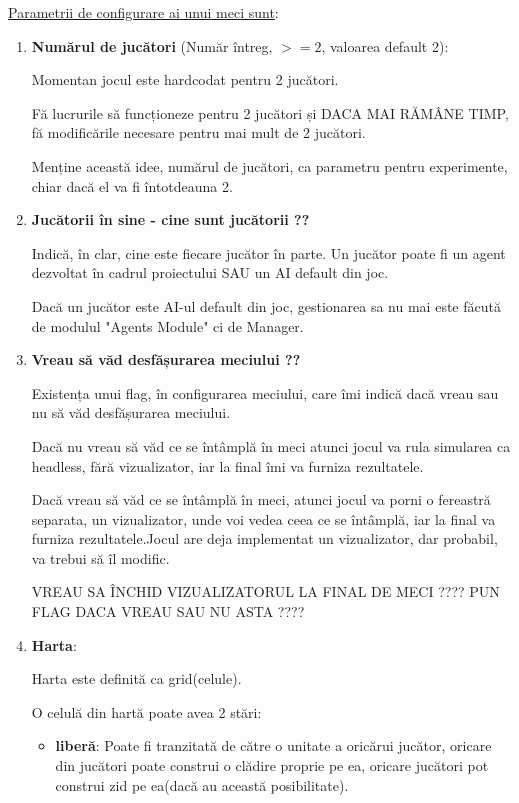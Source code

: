 \documentclass{article}
\begin{document}
\underline{Parametrii de configurare ai unui meci sunt}:
\begin{enumerate}
    \item \textbf{ Numărul de jucători }(Număr întreg, $>=2$, valoarea default 2):

    Momentan jocul este hardcodat pentru 2 jucători.

    Fă lucrurile să funcționeze pentru 2 jucători și DACA MAI RĂMÂNE TIMP, fă modificările necesare pentru mai mult de 2 jucători.

    Menține această idee, numărul de jucători, ca parametru pentru experimente, chiar dacă el va fi întotdeauna 2.

    \item \textbf{Jucătorii în sine - cine sunt jucătorii ??}

    Indică, în clar, cine este fiecare jucător în parte. Un jucător poate fi un agent dezvoltat în cadrul proiectului SAU un AI default din joc.

    Dacă un jucător este AI-ul default din joc, gestionarea sa nu mai este făcută de modulul "Agents Module" ci de Manager.

    \item \textbf{Vreau să văd desfășurarea meciului ??}

        Existența unui flag, în configurarea meciului, care îmi indică dacă vreau sau nu să văd desfășurarea meciului.

        Dacă nu vreau să văd ce se întâmplă în meci atunci jocul va rula simularea ca headless, fără vizualizator, iar la final îmi va furniza rezultatele.

        Dacă vreau să văd ce se întâmplă în meci, atunci jocul va porni o fereastră separata, un vizualizator, unde voi vedea ceea ce se întâmplă, iar la final va furniza rezultatele.Jocul are deja implementat un vizualizator, dar probabil, va trebui să îl modific.

        VREAU SA ÎNCHID VIZUALIZATORUL LA FINAL DE MECI ???? PUN FLAG DACA VREAU SAU NU ASTA ????

    \item \textbf{ Harta}:

        Harta este definită ca grid(celule).

        O celulă din hartă poate avea 2 stări:
        \begin{itemize}
            \item \textbf{liberă}: Poate fi tranzitată de către o unitate a oricărui jucător, oricare din jucători poate construi o clădire proprie pe ea, oricare jucători pot construi zid pe ea(dacă au această posibilitate).


\end{itemize}
\end{enumerate}
\end{document}
